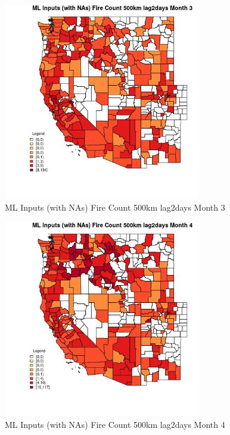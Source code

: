 \begin{figure} 
\centering  
\includegraphics[width=0.77\textwidth]{Code_Outputs/Report_ML_input_PM25_Step4_part_e_de_duplicated_aves_compiled_2019-05-21wNAs_CountyFire_Count_500km_lag2daysmedianMonth3.jpg} 
\caption{\label{fig:Report_ML_input_PM25_Step4_part_e_de_duplicated_aves_compiled_2019-05-21wNAsCountyFire_Count_500km_lag2daysmedianMonth3}ML Inputs (with NAs) Fire Count 500km lag2days Month 3} 
\end{figure} 
 

\begin{figure} 
\centering  
\includegraphics[width=0.77\textwidth]{Code_Outputs/Report_ML_input_PM25_Step4_part_e_de_duplicated_aves_compiled_2019-05-21wNAs_CountyFire_Count_500km_lag2daysmedianMonth4.jpg} 
\caption{\label{fig:Report_ML_input_PM25_Step4_part_e_de_duplicated_aves_compiled_2019-05-21wNAsCountyFire_Count_500km_lag2daysmedianMonth4}ML Inputs (with NAs) Fire Count 500km lag2days Month 4} 
\end{figure} 
 

